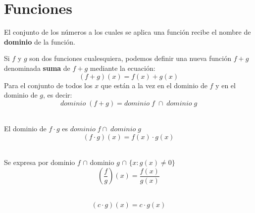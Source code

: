 \chapter{Funciones}


    \begin{def.}
	El conjunto de los números a los cuales se aplica una función recibe el nombre de \textbf{dominio} de la función.
    \end{def.}

    \begin{def.}
	Si $f$ \; y \; $g$ son dos funciones cualesquiera, podemos definir una nueva función $f+g$ denominada \textbf{suma} de $f+g$ mediante la ecuación:
	$$(f+g)(x)=f(x)+g(x)$$
	Para el conjunto de todos los $x$ que están a la vez en el dominio de $f$ y en el dominio de $g$, es decir: $$dominio \; (f+g)=dominio \; f \; \cap \; dominio \; g$$\\
    \end{def.}

    \begin{def.}
	El dominio de $f \cdot g$ es $dominio \; f \cap \; dominio \; g$ $$(f \cdot g)(x)=f(x)\cdot g(x)$$\\
    \end{def.}

    \begin{def.}
	Se expresa por dominio $f$ $\cap$ dominio $g$ $\cap$ $\lbrace x:g(x)\neq 0 \rbrace$
	$$\left( \dfrac{f}{g}\right) (x)=\dfrac{f(x)}{g(x)}$$ \\
    \end{def.}

    \begin{def.}
	$$(c \cdot g)(x)=c \cdot g(x)$$\\
    \end{def.}

